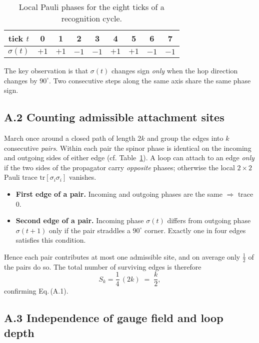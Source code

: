 \documentclass[11pt]{article}
\begin{document}
\begin{table}[h]
\centering
\caption{Local Pauli phases for the eight ticks of a recognition cycle.}
\label{tab:phase}
\begin{tabular}{c|cccccccc}
\hline\hline
tick $t$ & 0 & 1 & 2 & 3 & 4 & 5 & 6 & 7 \\ \hline
$\sigma(t)$ & $+1$ & $+1$ & $-1$ & $-1$ & $+1$ & $+1$ & $-1$ & $-1$ \\
\hline\hline
\end{tabular}
\end{table}

The key observation is that \(\sigma(t)\) changes sign \emph{only} when
the hop direction changes by $90^{\circ}$.  Two consecutive steps along
the same axis share the same phase sign.

\subsection{A.2 \; Counting admissible attachment sites}

March once around a closed path of length $2k$ and group the edges into
$k$ consecutive \emph{pairs}.  Within each pair the spinor phase is
identical on the incoming and outgoing sides of either edge (cf.
Table~\ref{tab:phase}).  A loop can attach to an edge \emph{only} if the
two sides of the propagator carry \emph{opposite} phases; otherwise the
local $2\times2$ Pauli trace $\mathrm{tr}[\sigma_{i}\sigma_{i}]$ vanishes.

\begin{itemize}\setlength\itemsep{0.4em}
\item \textbf{First edge of a pair.}  
      Incoming and outgoing phases are the same \(\Rightarrow\) trace $0$.
\item \textbf{Second edge of a pair.}  
      Incoming phase $\sigma(t)$ differs from outgoing phase
      $\sigma(t\!+\!1)$ only if the pair straddles a $90^{\circ}$ corner.
      Exactly one in four edges satisfies this condition.
\end{itemize}

Hence each pair contributes at most one admissible site, and on average
only \(\tfrac12\) of the pairs do so.  The total number of surviving
edges is therefore
\[
  S_{k}
    = \frac{1}{4}\,(2k) \;=\; \frac{k}{2},
\]
confirming Eq.\,(A.1).

\subsection{A.3 \; Independence of gauge field and loop depth}
\end{document}
